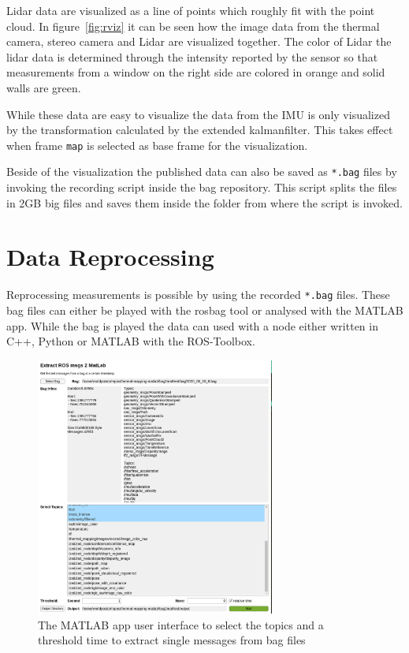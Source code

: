 Lidar data are visualized as a line of points which roughly fit with the point cloud.
In figure~\ref{fig:rviz} it can be seen how the image data from the thermal camera, stereo camera and Lidar are visualized together.
The color of Lidar the lidar data is determined through the intensity reported by the sensor so that measurements from a window on the right side are colored in orange and solid walls are green.

While these data are easy to visualize the data from the IMU is only visualized by the transformation calculated by the extended kalmanfilter.
This takes effect when frame \texttt{map} is selected as base frame for the visualization.

Beside of the visualization the published data can also be saved as \texttt{*.bag} files by invoking the recording script inside the bag repository.
This script splits the files in 2GB big files and saves them inside the folder from where the script is invoked.

\section{Data Reprocessing}\label{ch:results:sec:dataReprocessing}

Reprocessing measurements is possible by using the recorded \texttt{*.bag} files.
These bag files can either be played with the rosbag tool or analysed with the MATLAB app.
While the bag is played the data can used with a node either written in C++, Python or MATLAB with the ROS-Toolbox.

\begin{figure}
    \centering
    \includegraphics[width=0.7\textwidth]{img/results/matlab_app.png}
    \caption{The MATLAB app user interface to select the topics and a threshold time to extract single messages from bag files}
    \label{fig:matlab_app}
\end{figure}

